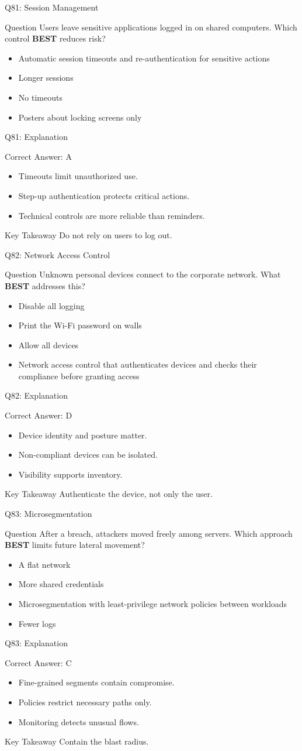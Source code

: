 \documentclass[aspectratio=169]{beamer}
\newcommand{\hq}[7]{%
	\begin{frame}{Q#1: #2}
		\begin{block}{Question}
			#3
		\end{block}
		\begin{itemize}
			#4
		\end{itemize}
	\end{frame}
	\begin{frame}{Q#1: Explanation}
		\begin{block}{Correct Answer: #5}
			\begin{itemize}
				#6
			\end{itemize}
		\end{block}
		\begin{alertblock}{Key Takeaway}
			#7
		\end{alertblock}
	\end{frame}
}
\begin{document}
	\hq{81}{Session Management}
	{Users leave sensitive applications logged in on shared computers. Which control \textbf{BEST} reduces risk?}
	{\item[\textbf{(A)}] Automatic session timeouts and re-authentication for sensitive actions
		\item[\textbf{(B)}] Longer sessions
		\item[\textbf{(C)}] No timeouts
		\item[\textbf{(D)}] Posters about locking screens only}
	{A}
	{\item Timeouts limit unauthorized use.
		\item Step-up authentication protects critical actions.
		\item Technical controls are more reliable than reminders.}
	{Do not rely on users to log out.}

	\hq{82}{Network Access Control}
	{Unknown personal devices connect to the corporate network. What \textbf{BEST} addresses this?}
	{\item[\textbf{(A)}] Disable all logging
		\item[\textbf{(B)}] Print the Wi-Fi password on walls
		\item[\textbf{(C)}] Allow all devices
		\item[\textbf{(D)}] Network access control that authenticates devices and checks their compliance before granting access}
	{D}
	{\item Device identity and posture matter.
		\item Non-compliant devices can be isolated.
		\item Visibility supports inventory.}
	{Authenticate the device, not only the user.}

	\hq{83}{Microsegmentation}
	{After a breach, attackers moved freely among servers. Which approach \textbf{BEST} limits future lateral movement?}
	{\item[\textbf{(A)}] A flat network
		\item[\textbf{(B)}] More shared credentials
		\item[\textbf{(C)}] Microsegmentation with least-privilege network policies between workloads
		\item[\textbf{(D)}] Fewer logs}
	{C}
	{\item Fine-grained segments contain compromise.
		\item Policies restrict necessary paths only.
		\item Monitoring detects unusual flows.}
	{Contain the blast radius.}
\end{document}
